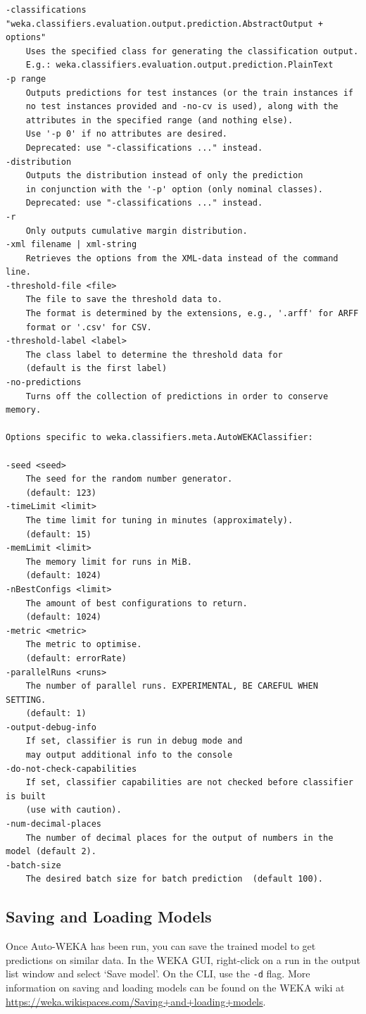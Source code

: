 \documentclass{article}
\begin{document}
\begin{verbatim}
-classifications "weka.classifiers.evaluation.output.prediction.AbstractOutput + options"
	Uses the specified class for generating the classification output.
	E.g.: weka.classifiers.evaluation.output.prediction.PlainText
-p range
	Outputs predictions for test instances (or the train instances if
	no test instances provided and -no-cv is used), along with the 
	attributes in the specified range (and nothing else). 
	Use '-p 0' if no attributes are desired.
	Deprecated: use "-classifications ..." instead.
-distribution
	Outputs the distribution instead of only the prediction
	in conjunction with the '-p' option (only nominal classes).
	Deprecated: use "-classifications ..." instead.
-r
	Only outputs cumulative margin distribution.
-xml filename | xml-string
	Retrieves the options from the XML-data instead of the command line.
-threshold-file <file>
	The file to save the threshold data to.
	The format is determined by the extensions, e.g., '.arff' for ARFF 
	format or '.csv' for CSV.
-threshold-label <label>
	The class label to determine the threshold data for
	(default is the first label)
-no-predictions
	Turns off the collection of predictions in order to conserve memory.

Options specific to weka.classifiers.meta.AutoWEKAClassifier:

-seed <seed>
	The seed for the random number generator.
	(default: 123)
-timeLimit <limit>
	The time limit for tuning in minutes (approximately).
	(default: 15)
-memLimit <limit>
	The memory limit for runs in MiB.
	(default: 1024)
-nBestConfigs <limit>
	The amount of best configurations to return.
	(default: 1024)
-metric <metric>
	The metric to optimise.
	(default: errorRate)
-parallelRuns <runs>
	The number of parallel runs. EXPERIMENTAL, BE CAREFUL WHEN SETTING.
	(default: 1)
-output-debug-info
	If set, classifier is run in debug mode and
	may output additional info to the console
-do-not-check-capabilities
	If set, classifier capabilities are not checked before classifier is built
	(use with caution).
-num-decimal-places
	The number of decimal places for the output of numbers in the model (default 2).
-batch-size
	The desired batch size for batch prediction  (default 100).
\end{verbatim}

\subsection{Saving and Loading Models}

Once Auto-WEKA has been run, you can save the trained model to get predictions
on similar data. In the WEKA GUI, right-click on a run in the output list window
and select `Save model'. On the CLI, use the \verb=-d= flag. More information on
saving and loading models can be found on the WEKA wiki at
\url{https://weka.wikispaces.com/Saving+and+loading+models}.
\end{document}
